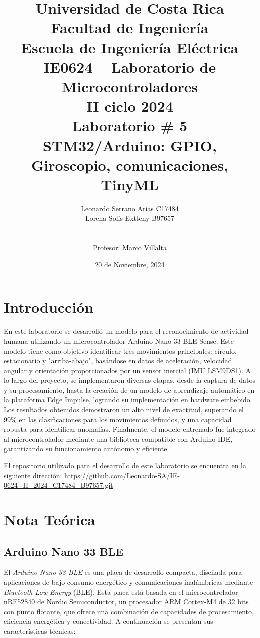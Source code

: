\documentclass[12pt,a4paper]{article}
\author{ Leonardo Serrano Arias C17484  \\Lorena Solís Extteny B97657\\{\small }\\ \\ Profesor: Marco Villalta  \vspace*{3.0in}}
\title{Universidad de Costa Rica\\{\small Facultad de Ingeniería\\Escuela de Ingeniería Eléctrica\\IE0624 – Laboratorio de Microcontroladores\\II ciclo 2024\\\vspace*{0.55in} Laboratorio \# 5 }\\ STM32/Arduino: GPIO, Giroscopio, comunicaciones, TinyML \vspace*{1.35in}}
\date{20 de Noviembre, 2024}
\begin{document}
 

\maketitle  
\thispagestyle{empty}%
\renewcommand{\thepage}{\roman{page}}
\newpage
\tableofcontents

\listoffigures 


\renewcommand{\thepage}{\arabic{page}} 
\setcounter{page}{1}

\newpage
\section{Introducción}
En este laboratorio se desarrolló un modelo para el reconocimiento de actividad humana utilizando un microcontrolador Arduino Nano 33 BLE Sense. Este modelo tiene como objetivo identificar tres movimientos principales: círculo, estacionario y "arriba-abajo", basándose en datos de aceleración, velocidad angular y orientación proporcionados por un sensor inercial (IMU LSM9DS1). A lo largo del proyecto, se implementaron diversas etapas, desde la captura de datos y su procesamiento, hasta la creación de un modelo de aprendizaje automático en la plataforma Edge Impulse, logrando su implementación en hardware embebido. Los resultados obtenidos demostraron un alto nivel de exactitud, superando el 99\% en las clasificaciones para los movimientos definidos, y una capacidad robusta para identificar anomalías. Finalmente, el modelo entrenado fue integrado al microcontrolador mediante una biblioteca compatible con Arduino IDE, garantizando su funcionamiento autónomo y eficiente.

El repositorio utilizado para el desarrollo de este laboratorio se encuentra en la siguiente dirección: \url{https://github.com/Leonardo-SA/IE-0624_II_2024_C17484_B97657.git}


\section{Nota Teórica}

\subsection{Arduino Nano 33 BLE}
El \textit{Arduino Nano 33 BLE} \cite{hoja} es una placa de desarrollo compacta, diseñada para aplicaciones de bajo consumo energético y comunicaciones inalámbricas mediante \textit{Bluetooth Low Energy} (BLE). Esta placa está basada en el microcontrolador nRF52840 de Nordic Semiconductor, un procesador ARM Cortex-M4 de 32 bits con punto flotante, que ofrece una combinación de capacidades de procesamiento, eficiencia energética y conectividad. A continuación se presentan sus características técnicas:
\end{document}
